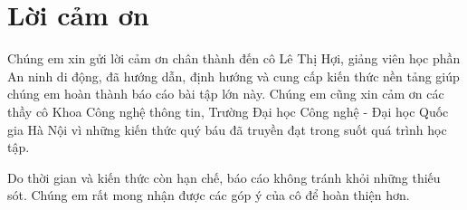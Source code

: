 \clearpage
{}
{}
\chapter*{Lời cảm ơn}

Chúng em xin gửi lời cảm ơn chân thành đến cô Lê Thị Hợi, giảng viên học phần An ninh di động, đã hướng dẫn, định hướng và cung cấp kiến thức nền tảng giúp chúng em hoàn thành báo cáo bài tập lớn này. Chúng em cũng xin cảm ơn các thầy cô Khoa Công nghệ thông tin, Trường Đại học Công nghệ - Đại học Quốc gia Hà Nội vì những kiến thức quý báu đã truyền đạt trong suốt quá trình học tập.

\vspace{0.3cm}

Do thời gian và kiến thức còn hạn chế, báo cáo không tránh khỏi những thiếu sót. Chúng em rất mong nhận được các góp ý của cô để hoàn thiện hơn.
